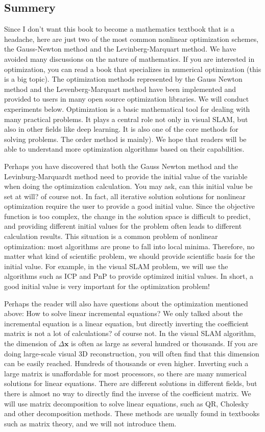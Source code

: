 \subsection{Summery}

Since I don't want this book to become a mathematics textbook that is a headache, here are just two of the most common nonlinear optimization schemes, the Gauss-Newton method and the Levinberg-Marquart method. We have avoided many discussions on the nature of mathematics. If you are interested in optimization, you can read a book that specializes in numerical optimization (this is a big topic)\cite{Nocedal2006}. The optimization methods represented by the Gauss Newton method and the Levenberg-Marquart method have been implemented and provided to users in many open source optimization libraries. We will conduct experiments below. Optimization is a basic mathematical tool for dealing with many practical problems. It plays a central role not only in visual SLAM, but also in other fields like deep learning. It is also one of the core methods for solving problems. The order method is mainly). We hope that readers will be able to understand more optimization algorithms based on their capabilities.

Perhaps you have discovered that both the Gauss Newton method and the Levinburg-Marquardt method need to provide the initial value of the variable when doing the optimization calculation. You may ask, can this initial value be set at will? of course not. In fact, all iterative solution solutions for nonlinear optimization require the user to provide a good initial value. Since the objective function is too complex, the change in the solution space is difficult to predict, and providing different initial values for the problem often leads to different calculation results. This situation is a common problem of nonlinear optimization: most algorithms are prone to fall into local minima. Therefore, no matter what kind of scientific problem, we should provide scientific basis for the initial value. For example, in the visual SLAM problem, we will use the algorithms such as ICP and PnP to provide optimized initial values. In short, a good initial value is very important for the optimization problem!

Perhaps the reader will also have questions about the optimization mentioned above: How to solve linear incremental equations? We only talked about the incremental equation is a linear equation, but directly inverting the coefficient matrix is not a lot of calculations? of course not. In the visual SLAM algorithm, the dimension of $\Delta \bm{x}$ is often as large as several hundred or thousands. If you are doing large-scale visual 3D reconstruction, you will often find that this dimension can be easily reached. Hundreds of thousands or even higher. Inverting such a large matrix is unaffordable for most processors, so there are many numerical solutions for linear equations. There are different solutions in different fields, but there is almost no way to directly find the inverse of the coefficient matrix. We will use matrix decomposition to solve linear equations, such as QR, Cholesky and other decomposition methods. These methods are usually found in textbooks such as matrix theory, and we will not introduce them.

